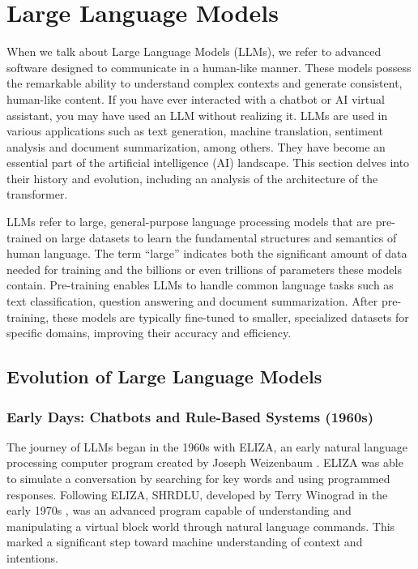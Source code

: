 \section{Large Language Models}

When we talk about Large Language Models (LLMs), we refer to advanced software designed to communicate in a human-like manner. These models possess the remarkable ability to understand complex contexts and generate consistent, human-like content. If you have ever interacted with a chatbot or AI virtual assistant, you may have used an LLM without realizing it. LLMs are used in various applications such as text generation, machine translation, sentiment analysis and document summarization, among others. They have become an essential part of the artificial intelligence (AI) landscape. This section delves into their history and evolution, including an analysis of the architecture of the transformer.

LLMs refer to large, general-purpose language processing models that are pre-trained on large datasets to learn the fundamental structures and semantics of human language. The term “large” indicates both the significant amount of data needed for training and the billions or even trillions of parameters these models contain. Pre-training enables LLMs to handle common language tasks such as text classification, question answering and document summarization. After pre-training, these models are typically fine-tuned to smaller, specialized datasets for specific domains, improving their accuracy and efficiency. \cite{researchgraph2024}

\subsection{Evolution of Large Language Models}

\subsubsection{Early Days: Chatbots and Rule-Based Systems (1960s)}

The journey of LLMs began in the 1960s with ELIZA, an early natural language processing computer program created by Joseph Weizenbaum \cite{weizenbaum1966eliza}. ELIZA was able to simulate a conversation by searching for key words and using programmed responses. Following ELIZA, SHRDLU, developed by Terry Winograd in the early 1970s \cite{winograd1972understanding}, was an advanced program capable of understanding and manipulating a virtual block world through natural language commands. This marked a significant step toward machine understanding of context and intentions.

